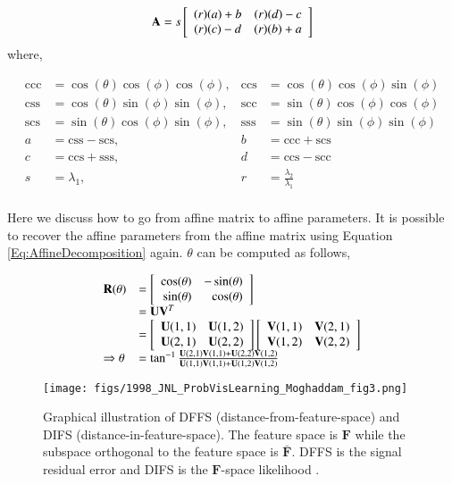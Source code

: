 \begin{equation}
\mathbf{A} = s \left[ \begin{array}{cc} (r)(a) + b & (r)(d) - c \\ (r)(c) - d & (r)(b) + a \end{array} \right]
\end{equation}
where,

\begin{equation*}
\begin{array}{llll}
\mathrm{ccc} &= \cos(\theta) \cos(\phi) \cos(\phi), & \mathrm{ccs} &= \cos(\theta) \cos(\phi) \sin(\phi)\\
\mathrm{css} &= \cos(\theta) \sin(\phi) \sin(\phi), & \mathrm{scc} &= \sin(\theta) \cos(\phi) \cos(\phi)\\
\mathrm{scs} &= \sin(\theta) \cos(\phi) \sin(\phi), & \mathrm{sss} &= \sin(\theta) \sin(\phi) \sin(\phi)\\
a   &=  \mathrm{css} - \mathrm{scs}, & b   &=  \mathrm{ccc} + \mathrm{scs}\\
c   &= \mathrm{ccs} + \mathrm{sss}, & d   &=  \mathrm{ccs} - \mathrm{scc}\\
s 			    &= \lambda_1, & r 			    &= \frac{\lambda_2}{\lambda_1}\\
\end{array}
\end{equation*}


Here we discuss how to go from affine matrix to affine parameters.  It is possible to recover the affine parameters from the affine matrix using Equation \ref{Eq:AffineDecomposition} again.  $\theta$  can be computed as follows,  

\begin{equation}
\begin{array}{lllllll}
\mathbf{R}(\theta) &= \left[ \begin{array}{rr} \cos(\theta) & -\sin(\theta) \\ \sin(\theta) & \cos(\theta) \\ \end{array} \right] \\
&= \mathbf{U}\mathbf{V}^T \\
&= \left[\begin{array}{llll}\mathbf{U}(1,1) & \mathbf{U}(1,2)\\\mathbf{U}(2,1) & \mathbf{U}(2,2)\end{array}\right]\left[\begin{array}{llll}\mathbf{V}(1,1) & \mathbf{V}(2,1)\\\mathbf{V}(1,2) & \mathbf{V}(2,2)\end{array}\right] \\
\Rightarrow \theta &= \tan^{-1}\frac{\mathbf{U}(2,1)\mathbf{V}(1,1) + \mathbf{U}(2,2)\mathbf{V}(1,2)}{\mathbf{U}(1,1)\mathbf{V}(1,1) + \mathbf{U}(1,2)\mathbf{V}(1,2)}
\end{array}
\end{equation}

								\begin{figure}[t]
								\centering
								\texttt{[image: figs/1998\_JNL\_ProbVisLearning\_Moghaddam\_fig3.png]}
								\caption{Graphical illustration of DFFS (distance-from-feature-space) and DIFS (distance-in-feature-space).  The feature space is $\mathbf{F}$ while the subspace orthogonal to the feature space is $\bar{\mathbf{F}}$.  DFFS is the signal residual error and DIFS is the $\mathbf{F}$-space likelihood \cite{1997_JNL_EigenTRK_Moghaddam}.}
								\label{fig:1997_JNL_DIFSDFFS_Moghaddam}
								\end{figure}



